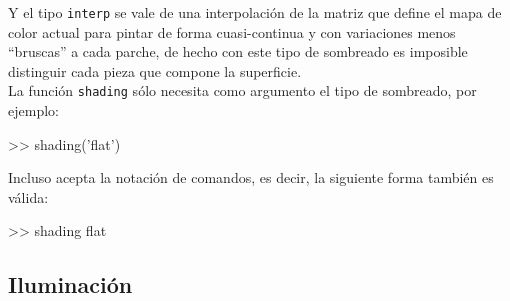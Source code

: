 Y el tipo \texttt{interp} se vale de una interpolación de la matriz que
define el mapa de color actual para pintar de forma cuasi-continua y con
variaciones menos ``bruscas'' a cada parche, de hecho con este tipo de
sombreado es imposible distinguir cada pieza que compone la superficie. \\

La función \texttt{shading} sólo necesita como argumento el tipo de
sombreado, por ejemplo:

\begin{matlab}
>> shading('flat')
\end{matlab}

Incluso acepta la notación de comandos, es decir, la siguiente forma
también es válida:

\begin{matlab}
>> shading flat
\end{matlab}

\subsection{Iluminación}